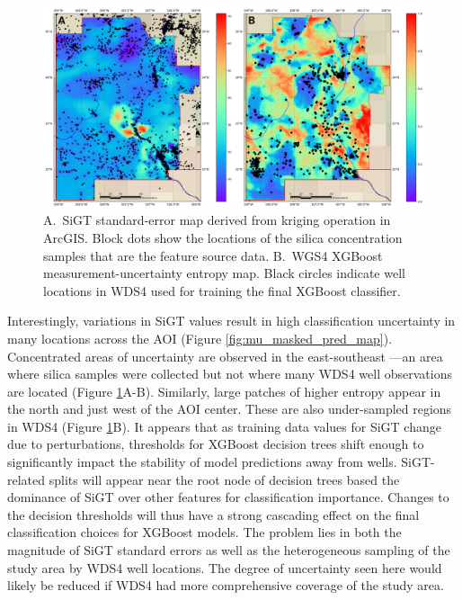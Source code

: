 \begin{figure}[!htp]
\centering
\includegraphics[width=\textwidth]{templates/images/Figure-MU_StdErr_vs_Uncert.png}
\caption[SiGT standard error and model entropy]
{A.\ SiGT standard-error map derived from kriging operation in ArcGIS. Block dots show the locations of the silica concentration samples that are the feature source data. B.\ WGS4 XGBoost measurement-uncertainty entropy map. Black circles indicate well locations in WDS4 used for training the final XGBoost classifier. }
\label{fig:mu_stderr_entropy}
\end{figure}

Interestingly, variations in SiGT values result in high classification uncertainty in many locations across the AOI (Figure \ref{fig:mu_masked_pred_map}). Concentrated areas of uncertainty are observed in the east-southeast ---an area where silica samples were collected but not where many WDS4 well observations are located (Figure \ref{fig:mu_stderr_entropy}A-B). Similarly, large patches of higher entropy appear in the north and just west of the AOI center. These are also under-sampled regions in WDS4 (Figure \ref{fig:mu_stderr_entropy}B). It appears that as training data values for SiGT change due to perturbations, thresholds for XGBoost decision trees shift enough to significantly impact the stability of model predictions away from wells. SiGT-related splits will appear near the root node of decision trees based the dominance of SiGT over other features for classification importance. Changes to the decision thresholds will thus have a strong cascading effect on the final classification choices for XGBoost models. The problem lies in both the magnitude of SiGT standard errors as well as the heterogeneous sampling of the study area by WDS4 well locations. The degree of uncertainty seen here would likely be reduced if WDS4 had more comprehensive coverage of the study area.

